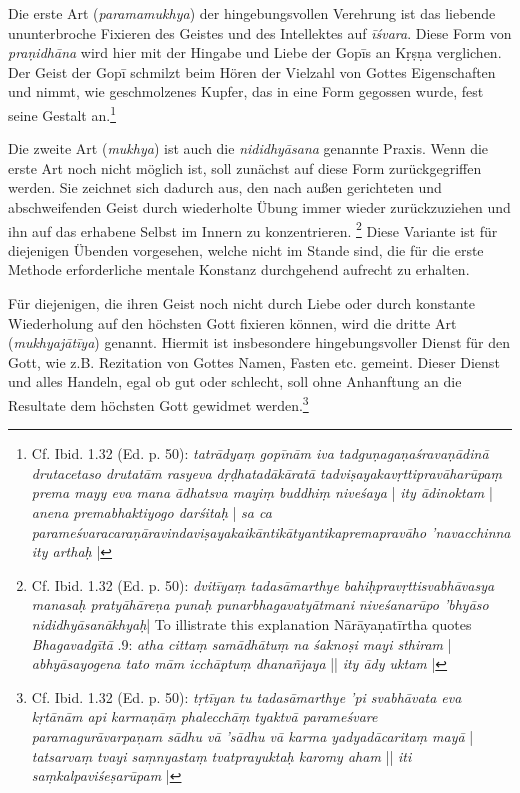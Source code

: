 Die erste Art (\textit{paramamukhya}) der hingebungsvollen Verehrung ist das liebende ununterbroche Fixieren des Geistes und des Intellektes auf \textit{īśvara}. Diese Form von \textit{praṇidhāna} wird hier mit der Hingabe und Liebe der Gopīs an Kṛṣṇa verglichen. Der Geist der Gopī schmilzt beim Hören der Vielzahl von Gottes Eigenschaften und nimmt, wie geschmolzenes Kupfer, das in eine Form gegossen wurde, fest seine Gestalt an.\footnote{Cf. Ibid. 1.32 (Ed. p. 50): \textit{tatrādyaṃ gopīnām iva tadguṇagaṇaśravaṇādinā drutacetaso drutatām rasyeva dṛḍhatadākāratā tadviṣayakavṛttipravāharūpaṃ prema mayy eva mana ādhatsva mayiṃ buddhiṃ niveśaya} | \textit{ity ādinoktam} | \textit{anena premabhaktiyogo darśitaḥ} | \textit{sa ca parameśvaracaraṇāravindaviṣayakaikāntikātyantikapremapravāho 'navacchinna ity arthaḥ} |} 

Die zweite Art (\textit{mukhya}) ist auch die \textit{nididhyāsana} genannte Praxis. Wenn die erste Art noch nicht möglich ist, soll zunächst auf diese Form zurückgegriffen werden. Sie zeichnet sich dadurch aus, den nach außen gerichteten und abschweifenden Geist durch wiederholte Übung immer wieder zurückzuziehen und ihn auf das erhabene Selbst im Innern zu konzentrieren. \footnote{Cf. Ibid. 1.32 (Ed. p. 50): \textit{dvitīyaṃ tadasāmarthye bahiḥpravṛttisvabhāvasya manasaḥ pratyāhāreṇa punaḥ punarbhagavatyātmani niveśanarūpo 'bhyāso nididhyāsanākhyaḥ}| To illistrate this explanation Nārāyaṇatīrtha quotes \textit{Bhagavadgītā} .9: \textit{atha cittaṃ samādhātuṃ na śaknoṣi mayi sthiram} | \textit{abhyāsayogena tato mām icchāptuṃ dhanañjaya} || \textit{ity ādy uktam} |} Diese Variante ist für diejenigen Übenden vorgesehen, welche nicht im Stande sind, die für die erste Methode erforderliche mentale Konstanz durchgehend aufrecht zu erhalten. 

Für diejenigen, die ihren Geist noch nicht durch Liebe oder durch konstante Wiederholung auf den höchsten Gott fixieren können, wird die dritte Art (\textit{mukhyajātīya}) genannt. Hiermit ist insbesondere hingebungsvoller Dienst für den Gott, wie z.B. Rezitation von Gottes Namen, Fasten etc. gemeint. Dieser Dienst und alles Handeln, egal ob gut oder schlecht, soll ohne Anhanftung an die Resultate dem höchsten Gott gewidmet werden.\footnote{Cf. Ibid. 1.32 (Ed. p. 50): \textit{tṛtīyan tu tadasāmarthye 'pi svabhāvata eva kṛtānām api karmaṇāṃ phalecchāṃ tyaktvā parameśvare paramagurāvarpaṇam sādhu vā 'sādhu vā karma yadyadācaritaṃ mayā} | \textit{tatsarvaṃ tvayi saṃnyastaṃ tvatprayuktaḥ karomy aham} || \textit{iti saṃkalpaviśeṣarūpam} |}

